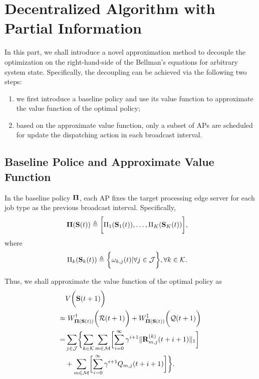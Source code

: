 \section{Decentralized Algorithm with Partial Information}
\label{sec:algorithm}

In this part, we shall introduce a novel approximation method to decouple the optimization on the right-hand-side of the Bellman's equations for arbitrary system state.
Specifically, the decoupling can be achieved via the following two steps:
\begin{enumerate}
    \item we first introduce a baseline policy and use its value function to approximate the value function of the optimal policy;
    \item based on the approximate value function, only a {subset of APs} are scheduled for update the dispatching action in each broadcast interval.
\end{enumerate}

\subsection{Baseline Police and Approximate Value Function}
\label{subsec:baseline}
\begin{definition}
    In the baseline policy $\boldsymbol{\Pi}$, each AP fixes the target processing edge server for each job type as the previous broadcast interval. Specifically,
    \begin{align}
        \boldsymbol{\Pi}(\mathbf{S}(t)) &\triangleq \bigg[ \Pi_{1}(\mathbf{S}_{1}(t)), \dots, \Pi_{K}(\mathbf{S}_{K}(t)) \bigg],
    \end{align}
    where 
    \begin{align}
        \Pi_{k}(\mathbf{S}_{k}(t)) &\triangleq \bigg\{
            \omega_{k,j}(t) | \forall j\in\mathcal{J}
        \bigg\}, \forall k\in\mathcal{K}.
    \end{align}
\end{definition}

Thus, we shall approximate the value function of the optimal policy as
\begin{align}
    &V\Paren{\Stat(t+1)} 
    \nonumber\\
    \approx&~ W^{\dagger}_{\Baseline(\Stat(t))} \Paren{\mathcal{R}(t+1)} + W^{\ddagger}_{\Baseline(\Stat(t))}\Paren{\mathcal{Q}(t+1)}
    \nonumber\\
    =& \sum_{j\in\jSpace}\Brace{
        \sum_{k\in\apSet}\sum_{m\in\esSet}\Bracket{ \sum_{i=0}^{\infty} \gamma^{i+1} \Inorm{\vec{R}^{(k)}_{m,j}(t+i+1)} }
        \nonumber\\
        & + \sum_{m\in\esSet} \Bracket{ \sum_{i=0}^{\infty} \gamma^{i+1} Q_{m,j}(t+i+1) }
    }.
\end{align}

